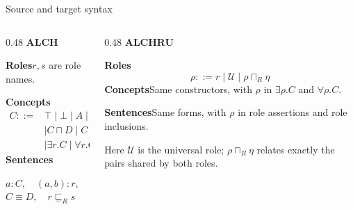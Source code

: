 \documentclass[aspectratio=169,10pt]{beamer}
\begin{document}
\begin{frame}[t]{Source and target syntax}
\begin{columns}[t,onlytextwidth]
  \begin{column}{0.48\textwidth}
    {\color{accent}\large\bfseries ALCH}\par\medskip
    \textbf{Roles}\quad $r,s$ are role names.\par\medskip
    \textbf{Concepts}
    \[
      \begin{aligned}
      C ::= {}& \top \mid \bot \mid A \mid \neg C\\
              & \mid C\sqcap D \mid C\sqcup D\\
              & \mid \exists r.C \mid \forall r.C
      \end{aligned}
    \]
    \textbf{Sentences}\par
    $a:C,\quad (a,b):r,\quad C\sqsubseteq D,$\\
    $C\equiv D,\quad r\sqsubseteq_R s$
  \end{column}
  \begin{column}{0.48\textwidth}
    {\color{accent}\large\bfseries ALCHRU}\par\medskip
    \textbf{Roles}
    \[
      \rho ::= r \mid \mathcal U \mid \rho\sqcap_R\eta
    \]
    \textbf{Concepts}\quad Same constructors, with $\rho$ in
    $\exists\rho.C$ and $\forall\rho.C$.\par\bigskip
    \textbf{Sentences}\quad Same forms, with $\rho$ in role
    assertions and role inclusions.\par\bigskip
    \textcolor{muted}{Here $\mathcal U$ is the universal role;
    $\rho\sqcap_R\eta$ relates exactly the pairs shared by both roles.}
  \end{column}
\end{columns}
\end{frame}
\end{document}

